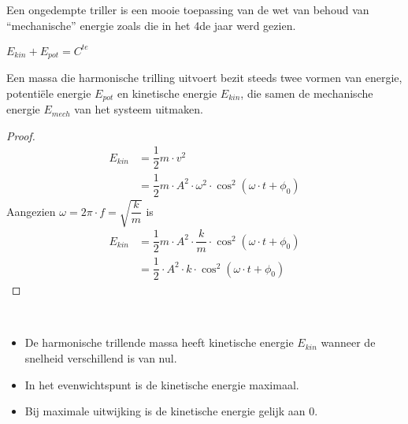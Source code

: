 \documentclass{ximera}
\begin{document}
    \author{Ingmar Herreman}
    \date{Januari 2024}


\begin{center}
\end{center}

Een ongedempte triller is een mooie toepassing van de wet van behoud van “mechanische” energie zoals die in het 4de jaar werd gezien.
\begin{center}
$E_{kin}+E_{pot}=C^{te}$
\end{center}
Een massa die harmonische trilling uitvoert bezit steeds twee vormen van energie, potentiële energie $E_{pot}$ en kinetische energie $E_{kin}$, die samen de mechanische energie $E_{mech}$ van het systeem uitmaken.

\begin{proof}
\begin{align*}
    E_{kin} & = \dfrac{1}{2}m\cdot v^2 \\
    &=\dfrac{1}{2}m\cdot A^2\cdot \omega^2 \cdot \cos^2 (\omega \cdot t+\phi_0)
\end{align*}
Aangezien $\omega=2\pi\cdot f =\sqrt{\dfrac{k}{m}}$ is
\begin{align*}
    E_{kin}&=\dfrac{1}{2}m\cdot A^2\cdot \dfrac{k}{m} \cdot \cos^2 (\omega \cdot t+\phi_0) \\
    &=\dfrac{1}{2}\cdot A^2\cdot k \cdot \cos^2 (\omega \cdot t+\phi_0) 
\end{align*}
\end{proof}


\begin{definition}
      \ \\
    \begin{center}
    \end{center}
\end{definition}
\begin{remark}
    \begin{itemize}
        \item 	De harmonische trillende massa heeft kinetische energie $E_{kin}$ wanneer de snelheid verschillend is van nul.
	\item In het evenwichtspunt is de kinetische energie maximaal.
	\item Bij maximale uitwijking is de kinetische energie gelijk aan 0.
    \end{itemize}
\end{remark}
\end{document}
